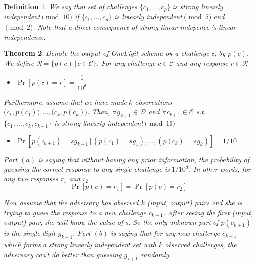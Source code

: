 \documentclass{article}
\newtheorem{theorem}{Theorem}
\newtheorem{definition}[theorem]{Definition}
\begin{document}
\begin{definition}
We say that set of challenges $\{c_1,\ldots,c_p\}$ is strong linearly independent$\pmod{10}$ if $\{c_1,\ldots,c_p\}$ is linearly independent$\pmod{5}$ and$\pmod{2}$. Note that a direct consequence of strong linear indepence is linear independence.
\end{definition}
                                                                                                            

\begin{theorem}
\label{main}
	Denote the output of OneDigit schema on a challenge $c$, by $p(c)$. We define $\mathcal{R}=\{p(c) \, | \, c\in\mathcal{C}\}$. For any challenge $c\in \mathcal{C}$ and any response $r\in \mathcal{R}$
	\begin{itemize} 
		\item[$(a)$]$\Pr[p(c)=r]=\dfrac{1}{10^d}$
	\end{itemize}
Furthermore, assume that we have made $k$ observations $\big(c_1,p(c_1)\big),\ldots, \big(c_k, p(c_k)\big)$. Then, $\forall g_{k+1}\in\mathcal{D}$ and $\forall c_{k+1}\in \mathcal{C}$ s.t. $\{c_1,\ldots,c_k,c_{k+1}\}$ is strong linearly independent$\pmod{10}$ 
	\begin{itemize}
		\item[$(b)$] $\Pr[p(c_{k+1})=s g_{k+1} \, | \, (p(c_1)=s g_1),\ldots, (p(c_k)=s g_k)]=1/10$
	\end{itemize}
Part $(a)$ is saying that without having any prior information, the probability of guessing the correct response to any single challenge is ${1}/{10^d}$. In other words, for any two responses $r_1$ and $r_2$
$$\Pr[p(c)=r_1]=\Pr[p(c)=r_2]$$

\noindent Now assume that the adversary has observed $k$ (input, output) pairs and she is trying to guess the response to a new challenge $c_{k+1}$. After seeing the first (input, output) pair, she will know the value of $s$. So the only unknown part of $p(c_{k+1})$ is the single digit $g_{k+1}$. Part $(b)$ is saying that for any new challenge $c_{k+1}$ which forms a strong linearly independent set with $k$ observed challenges, the adversary can't do better than guessing $g_{k+1}$ randomly.

\end{theorem}
\end{document}
